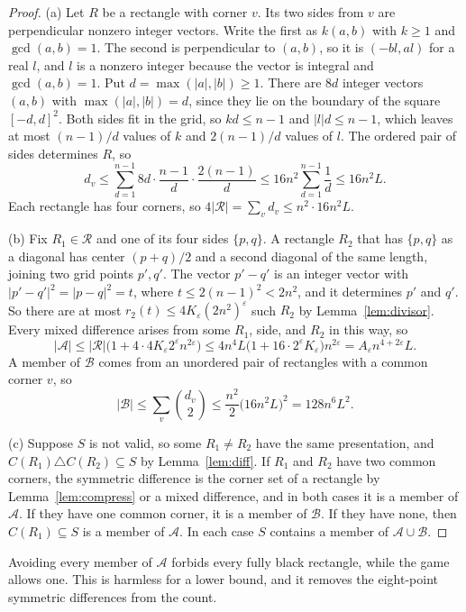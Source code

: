 \begin{proof}
(a) Let $R$ be a rectangle with corner $v$. Its two sides from $v$ are perpendicular nonzero integer vectors. Write the first as $k(a,b)$ with $k\ge1$ and $\gcd(a,b)=1$. The second is perpendicular to $(a,b)$, so it is $(-bl,al)$ for a real $l$, and $l$ is a nonzero integer because the vector is integral and $\gcd(a,b)=1$. Put $d=\max(|a|,|b|)\ge1$. There are $8d$ integer vectors $(a,b)$ with $\max(|a|,|b|)=d$, since they lie on the boundary of the square $[-d,d]^2$. Both sides fit in the grid, so $kd\le n-1$ and $|l|d\le n-1$, which leaves at most $(n-1)/d$ values of $k$ and $2(n-1)/d$ values of $l$. The ordered pair of sides determines $R$, so
\[
d_v\le\sum_{d=1}^{n-1}8d\cdot\frac{n-1}{d}\cdot\frac{2(n-1)}{d}\le16n^2\sum_{d=1}^{n-1}\frac1d\le16n^2L.
\]
Each rectangle has four corners, so $4|\mathcal R|=\sum_vd_v\le n^2\cdot16n^2L$.

(b) Fix $R_1\in\mathcal R$ and one of its four sides $\{p,q\}$. A rectangle $R_2$ that has $\{p,q\}$ as a diagonal has center $(p+q)/2$ and a second diagonal of the same length, joining two grid points $p',q'$. The vector $p'-q'$ is an integer vector with $|p'-q'|^2=|p-q|^2=t$, where $t\le2(n-1)^2<2n^2$, and it determines $p'$ and $q'$. So there are at most $r_2(t)\le4K_\varepsilon(2n^2)^\varepsilon$ such $R_2$ by Lemma~\ref{lem:divisor}. Every mixed difference arises from some $R_1$, side, and $R_2$ in this way, so
\[
|\mathcal A|\le|\mathcal R|\bigl(1+4\cdot4K_\varepsilon2^\varepsilon n^{2\varepsilon}\bigr)\le4n^4L\bigl(1+16\cdot2^\varepsilon K_\varepsilon\bigr)n^{2\varepsilon}=A_\varepsilon n^{4+2\varepsilon}L .
\]
A member of $\mathcal B$ comes from an unordered pair of rectangles with a common corner $v$, so
\[
|\mathcal B|\le\sum_v\binom{d_v}2\le\frac{n^2}2\bigl(16n^2L\bigr)^2=128n^6L^2 .
\]

(c) Suppose $S$ is not valid, so some $R_1\ne R_2$ have the same presentation, and $C(R_1)\triangle C(R_2)\subseteq S$ by Lemma~\ref{lem:diff}. If $R_1$ and $R_2$ have two common corners, the symmetric difference is the corner set of a rectangle by Lemma~\ref{lem:compress} or a mixed difference, and in both cases it is a member of $\mathcal A$. If they have one common corner, it is a member of $\mathcal B$. If they have none, then $C(R_1)\subseteq S$ is a member of $\mathcal A$. In each case $S$ contains a member of $\mathcal A\cup\mathcal B$.
\end{proof}

Avoiding every member of $\mathcal A$ forbids every fully black rectangle, while the game allows one. This is harmless for a lower bound, and it removes the eight-point symmetric differences from the count.

